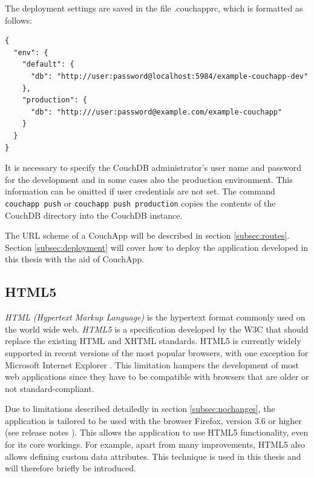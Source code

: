 The deployment settings are saved in the file {\selectfont .couchapprc}, which is formatted as follows:

\lstset{language=javascript}
\medskip
\begin{lstlisting}[label=code:couchapprc,caption=Couchapp: .couchapprc]
{
  "env": { 
    "default": {
      "db": "http://user:password@localhost:5984/example-couchapp-dev"
    },
    "production": {
      "db": "http:///user:password@example.com/example-couchapp"
    }
  }
}
\end{lstlisting}


It is necessary to specify the CouchDB administrator's user name and password for the development and in some cases also the production environment. This information can be omitted if user credentials are not set. The command \lstinline!couchapp push! or \lstinline!couchapp push production! copies the contents of the CouchDB directory into the CouchDB instance.

The URL scheme of a CouchApp will be described in section \ref{subsec:routes}. Section \ref{subsec:deployment} will cover how to deploy the application developed in this thesis with the aid of CouchApp.
 


\subsection{HTML5}
\label{subsec:html5}

\textit{HTML (Hypertext Markup Language)} is the hypertext format commonly used on the world wide web. \textit{HTML5} \cite{html5:homepage} is a specification developed by the W3C that should replace the existing HTML and XHTML standards. HTML5 is currently widely supported in recent versions of the most popular browsers, with one exception for Microsoft Internet Explorer \cite{html5:browser}. This limitation hampers the development of most web applications since they have to be compatible with browsers that are older or not standard-compliant.

Due to limitations described detailedly in section \ref{subsec:nochanges}, the application is tailored to be used with the browser Firefox, version 3.6 or higher (see release notes \cite{firefox36}). This allows the application to use HTML5 functionality, even for its core workings. For example, apart from many improvements, HTML5 also allows defining custom data attributes. This technique is used in this thesis and will therefore briefly be introduced.

